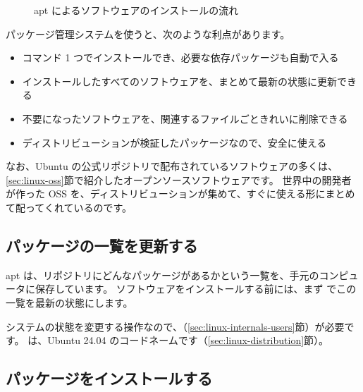 \begin{figure}[tb]
  \centering
  
  \caption{apt によるソフトウェアのインストールの流れ}
  \label{fig:package-apt}
\end{figure}

パッケージ管理システムを使うと、次のような利点があります。

\begin{itemize}
  \item コマンド 1 つでインストールでき、必要な依存パッケージも自動で入る
  \item インストールしたすべてのソフトウェアを、まとめて最新の状態に更新できる
  \item 不要になったソフトウェアを、関連するファイルごときれいに削除できる
  \item ディストリビューションが検証したパッケージなので、安全に使える
\end{itemize}

なお、Ubuntu の公式リポジトリで配布されているソフトウェアの多くは、\ref{sec:linux-oss}節で紹介したオープンソースソフトウェアです。
世界中の開発者が作った OSS を、ディストリビューションが集めて、すぐに使える形にまとめて配ってくれているのです。

\subsection{パッケージの一覧を更新する}

apt は、リポジトリにどんなパッケージがあるかという一覧を、手元のコンピュータに保存しています。
ソフトウェアをインストールする前には、まず  でこの一覧を最新の状態にします。


システムの状態を変更する操作なので、（\ref{sec:linux-internals-users}節）が必要です。
 は、Ubuntu 24.04 のコードネームです（\ref{sec:linux-distribution}節）。

\subsection{パッケージをインストールする}

